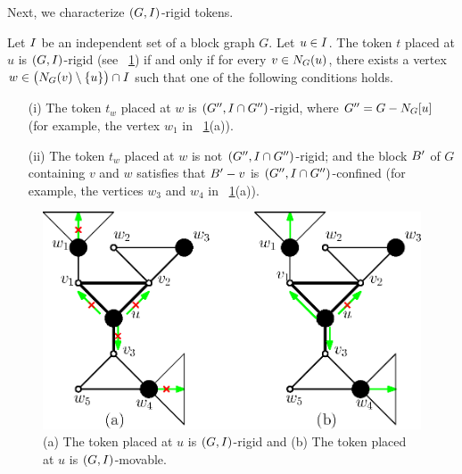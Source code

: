 \documentclass[a4paper]{llncs}
\begin{document}
Next, we characterize $(G, I)$-rigid tokens.


\begin{lemma}
\label{lem:characterize-rigid-token}
Let $I$ be an independent set of a block graph $G$.
Let $u \in I$.
The token $t$ placed at $u$ is $(G, I)$-rigid (see \figurename~\ref{fig:characterize-rigid-tokens}) if and only if 
	for every $v \in N_{G}(u)$, 
	there exists a vertex $w \in \big(N_{G}(v) \setminus \{u\}\big) \cap I$ such that one of the following conditions holds.

\begin{itemize}
\item [(i)] The token $t_w$ placed at $w$ is $(G^{\prime\prime}, I \cap G^{\prime\prime})$-rigid, where $G^{\prime\prime} = G - N_{G}[u]$ (for example, the vertex $w_1$ in \figurename~\ref{fig:characterize-rigid-tokens}(a)).

\item [(ii)] The token $t_w$ placed at $w$ is not $(G^{\prime\prime}, I \cap G^{\prime\prime})$-rigid; and the block $B^{\prime}$ of $G$ containing $v$ and $w$ satisfies that $B^{\prime} - v$ is $(G^{\prime\prime}, I \cap G^{\prime\prime})$-confined (for example, the vertices $w_3$ and $w_4$ in \figurename~\ref{fig:characterize-rigid-tokens}(a)).
\end{itemize}

\noindent
\end{lemma}




\begin{figure}[!ht]  %
  \centerline{\includegraphics[scale=0.6]{fig/characterize-rigid-tokens.eps}}
  \caption{
  (a) The token placed at $u$ is $(G, I)$-rigid and (b) The token placed at $u$ is $(G, I)$-movable. \label{fig:characterize-rigid-tokens}
  }
\end{figure}
\end{document}
